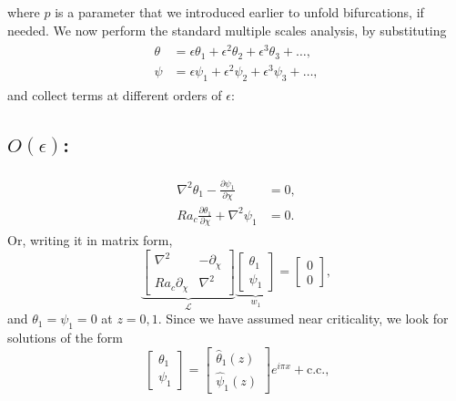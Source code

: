 \documentclass{article}
\newcommand{\pd}[2]{\frac{\partial{#1}}{\partial{#2}}}
\newcommand{\lap}[1]{\nabla^{2}{#1}}
\begin{document}
%
where $p$ is a parameter that we introduced earlier to unfold bifurcations, if needed. 
%
We now perform the standard multiple scales analysis, by substituting 
\begin{align}
 \begin{split}
  \theta &= \epsilon \theta_{1} + \epsilon^{2} \theta_{2} + \epsilon^{3} \theta_{3} + \hdots,  \\ 
  \psi &= \epsilon \psi_{1} + \epsilon^{2} \psi_{2} + \epsilon^{3} \psi_{3} + \hdots, 
 \end{split}
\end{align}
 and collect terms at different orders of $\epsilon$:
%
\subsection{$O(\epsilon)$:}
%
\begin{align}
 \begin{split}
  \lap{\theta_{1}} - \pd{\psi_{1}}{\chi} &= 0, \\
  Ra_{c} \pd{\theta_{1}}{\chi} + \lap{\psi_{1}} &=0.
 \end{split}
\end{align}
Or, writing it in matrix form,
\begin{equation}\label{eq:order_1}
 \underbrace{\begin{bmatrix}
  \lap{} & -\partial_{\chi} \\
  Ra_{c}\partial_{\chi} & \lap{}
 \end{bmatrix}}_{\mathcal{L}}
 \underbrace{\begin{bmatrix}
  \theta_{1} \\
 \psi_{1}
 \end{bmatrix}}_{w_{1}}
 = \begin{bmatrix}
  0 \\
  0
 \end{bmatrix},
\end{equation}
and $\theta_{1} = \psi_{1} = 0$ at $z=0, 1$. 
Since we have assumed near criticality, we look for solutions of the form
\begin{equation}
 \begin{bmatrix}
  \theta_{1} \\
 \psi_{1}
 \end{bmatrix} =
 \begin{bmatrix}
  \hat{\theta}_{1}(z) \\
 \hat{\psi}_{1}(z)
 \end{bmatrix}
 e^{i\pi x} + \textrm{c.c.,}
\end{equation}
\end{document}
